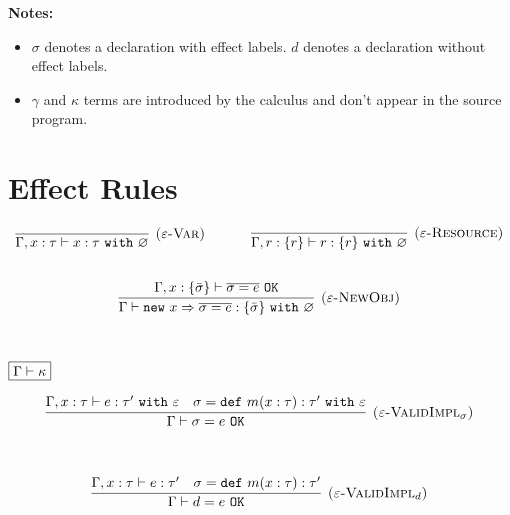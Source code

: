 \documentclass{llncs}
\newcommand{\keywadj}[1]{\mathtt{#1}}
\newcommand{\keyw}[1]{\keywadj{#1}~}
\begin{document}
\noindent \textbf{Notes:}

\begin{itemize}
	\item $\sigma$ denotes a declaration with effect labels. $d$ denotes a declaration without effect labels.
	\item $\gamma$ and $\kappa$ terms are introduced by the calculus and don't appear in the source program.
\end{itemize}

\section{Effect Rules}

\fbox{$\Gamma \vdash e : \tau~\keyw{with} \varepsilon$}

\[
\begin{array}{c}
\infer[\textsc{($\varepsilon$-Var)}]
  {\Gamma, x:\tau \vdash x:\tau~ \keyw{with} \varnothing}
  {} 
~~~~~~~~~~
\infer[\textsc{($\varepsilon$-Resource)}]
  {\Gamma, r :\{r\} \vdash r:\{ r \} ~ \keyw{with} \varnothing}
  {} \\[5ex]

\infer[\textsc{($\varepsilon$-NewObj)}]
	{\Gamma \vdash \keywadj{new}~x \Rightarrow \overline{\sigma = e} : \{ \bar \sigma \}~\keyw{with} \varnothing}
	{\Gamma, x : \{ \bar \sigma \} \vdash \overline{\sigma = e}~\keywadj{OK}} \\[5ex]
\end{array}
\]



$\fbox{$\Gamma \vdash \kappa$}$

\[
\begin{array}{c}
\infer[\textsc{($\varepsilon$-ValidImpl$_\sigma$)}]
	{\Gamma \vdash \sigma = e~\keywadj{OK}}
	{\Gamma, x:\tau \vdash e: \tau'~\keyw{with} \varepsilon & \sigma = \keyw{def} m(x:\tau):\tau'~\keyw{with} \varepsilon} \\[5ex]
\end{array}
\]

\[
\begin{array}{c}
\infer[\textsc{($\varepsilon$-ValidImpl$_d$)}]
	{\Gamma \vdash d = e~\keywadj{OK}}
	{\Gamma, x:\tau \vdash e: \tau' & \sigma = \keyw{def} m(x:\tau):\tau'} \\[5ex]
\end{array}
\]
\end{document}
